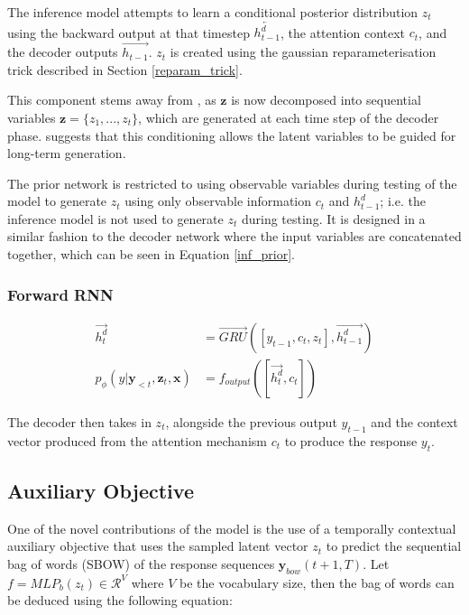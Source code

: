 \documentclass[12pt,twoside]{report}
\begin{document}
The inference model attempts to learn a conditional posterior distribution $z_t$ using the backward output at that timestep $\overleftarrow{h^d_{t-1}}$, the attention context $c_t$, and the decoder outputs $\overrightarrow{h_{t-1}}$. $z_t$ is created using the gaussian reparameterisation trick described in Section \ref{reparam_trick}.

This component stems away from \cite{zhao_learning_2017}, as $\boldsymbol{z}$ is now decomposed into sequential variables $\boldsymbol{z} = \{z_1,...,z_t\}$, which are generated at each time step of the decoder phase.  \cite{du_variational_2018} suggests that this conditioning allows the latent variables to be guided for long-term generation.

The prior network is restricted to using observable variables during testing of the model to generate $z_t$ using only observable information $c_t$ and $h^d_{t-1}$; i.e. the inference model is not used to generate $z_t$ during testing. It is designed in a similar fashion to the decoder network where the input variables are concatenated together, which can be seen in Equation \ref{inf_prior}. 

\subsubsection{Forward RNN}


\begin{equation}
	\begin{split}
		\overrightarrow{h^d_t} &= \overrightarrow{GRU}([y_{t-1},c_t,z_t], \overrightarrow{h^d_{t-1}}) \\
		p_\phi(y|\boldsymbol{y}_{<t},\boldsymbol{z}_t, \boldsymbol{x}) &= f_{output}([\overrightarrow{h^d_t}, c_t])
	\end{split}
\end{equation}

The decoder then takes in $z_t$, alongside the previous output $y_{t-1}$ and the context vector produced from the attention mechanism $c_t$ to produce the response $y_t$.

\subsection{Auxiliary Objective}
\label{aux_obj}
One of the novel contributions of the model is the use of a temporally contextual auxiliary objective that uses the sampled latent vector $z_t$ to predict the sequential bag of words (SBOW) of the response sequences $\boldsymbol{y}_{bow}(t+1,T)$. Let $f=MLP_b(z_t) \in \mathcal{R}^V$ where $V$ be the vocabulary size, then the bag of words can be deduced using the following equation:
\end{document}
